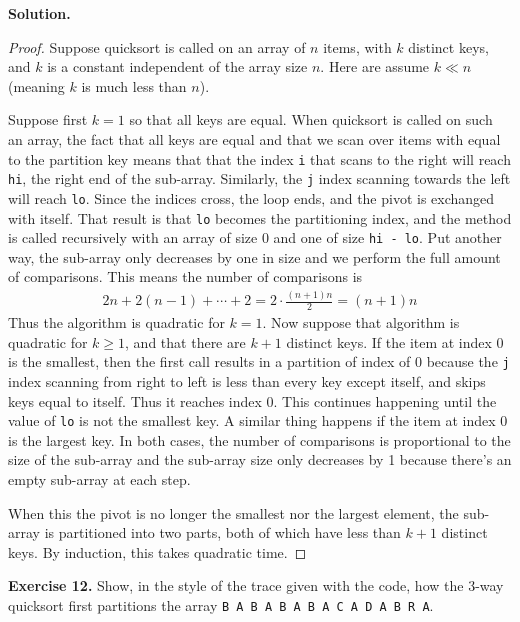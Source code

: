 \documentclass[12pt, a4paper]{article}
\newenvironment{ex}[2][Exercise]
{\par\medskip\noindent \textbf{#1 #2.}}
{\medskip}
\newenvironment{sol}[1][Solution]
{\par\medskip\noindent \textbf{#1.} }
{\medskip}
\begin{document}
	\begin{sol}
		\begin{proof}
			Suppose quicksort is called on an array of $n$ items, with $k$ distinct
			keys, and $k$ is a constant independent of the array size $n$.
			Here are assume $k\ll n$ (meaning $k$ is much less than $n$).
			
			Suppose first $k=1$ so that all keys are equal. When quicksort is called
			on such an array, the fact that all keys are equal and that we scan over
			items with equal to the partition key means that that the index \texttt{i}
			that scans to the right will reach \texttt{hi}, the right end of the sub-array.
			Similarly, the \texttt{j} index scanning towards the left will reach \texttt{lo}.
			Since the indices cross, the loop ends, and the pivot is exchanged with itself.
			That result is that \texttt{lo} becomes the partitioning index, and the
			method is called recursively with an array of size 0 and one of size
			\texttt{hi - lo}. Put another way, the sub-array only decreases by one in
			size and we perform the full amount of comparisons. This means the number
			of comparisons is
			\begin{align*}
				2n + 2(n-1)+\cdots+2=2\cdot \frac{(n+1)n}{2}=(n+1)n
			\end{align*}
			Thus the algorithm is quadratic for $k=1$. Now suppose that algorithm
			is quadratic for $k\geq  1$, and that there are $k+1$ distinct keys.
			If the item at index 0 is the smallest, then the first call results
			in a partition of index of 0 because the \texttt{j} index scanning from
			right to left is less than every key except itself, and skips keys equal
			to itself. Thus it reaches index 0. This continues happening until the
			value of \texttt{lo} is not the smallest key. A similar thing happens
			if the item at index 0 is the largest key. In both cases, the number
			of comparisons is proportional to the size of the sub-array and the sub-array
			size only decreases by 1 because there's an empty sub-array at each step.
			
			When this the pivot is no longer the smallest nor the largest element, 
			the sub-array is partitioned into two parts, both of which have less than
			$k+1$ distinct keys. By induction, this takes quadratic time.
		\end{proof}
	\end{sol}
	\begin{ex}{12}
		Show, in the style of the trace given with the code, how the 3-way quicksort
		first partitions the array \texttt{B A B A B A B A C A D A B R A}.
	\end{ex}
\end{document}
